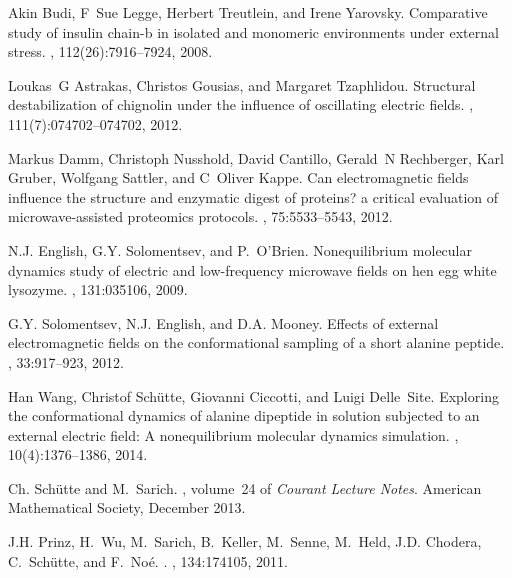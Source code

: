 \documentclass[journal=jctcce,manuscript=article]{achemso}
\begin{document}
\begin{thebibliography}{10}
Akin Budi, F~Sue Legge, Herbert Treutlein, and Irene Yarovsky.
\newblock Comparative study of insulin chain-b in isolated and monomeric
  environments under external stress.
, 112(26):7916--7924, 2008.

Loukas~G Astrakas, Christos Gousias, and Margaret Tzaphlidou.
\newblock Structural destabilization of chignolin under the influence of
  oscillating electric fields.
, 111(7):074702--074702, 2012.

Markus Damm, Christoph Nusshold, David Cantillo, Gerald~N Rechberger, Karl
  Gruber, Wolfgang Sattler, and C~Oliver Kappe.
\newblock Can electromagnetic fields influence the structure and enzymatic
  digest of proteins? a critical evaluation of microwave-assisted proteomics
  protocols.
, 75:5533--5543, 2012.

N.J. English, G.Y. Solomentsev, and P.~O'Brien.
\newblock Nonequilibrium molecular dynamics study of electric and low-frequency
  microwave fields on hen egg white lysozyme.
, 131:035106, 2009.

G.Y. Solomentsev, N.J. English, and D.A. Mooney.
\newblock Effects of external electromagnetic fields on the conformational
  sampling of a short alanine peptide.
, 33:917--923, 2012.

Han Wang, Christof Sch{\"u}tte, Giovanni Ciccotti, and Luigi Delle~Site.
\newblock Exploring the conformational dynamics of alanine dipeptide in
  solution subjected to an external electric field: {A} nonequilibrium
  molecular dynamics simulation.
, 10(4):1376--1386,
  2014.

Ch. Sch\"utte and M.~Sarich.
, volume~24 of {\em Courant
  Lecture Notes}.
\newblock American Mathematical Society, December 2013.

J.H. Prinz, H.~Wu, M.~Sarich, B.~Keller, M.~Senne, M.~Held, J.D. Chodera,
  C.~Sch{\"u}tte, and F.~No{\'e}.
.
, 134:174105, 2011.


\end{thebibliography}
\end{document}
